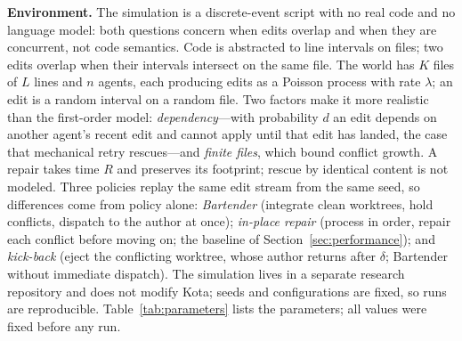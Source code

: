 \documentclass[pdflatex,sn-mathphys-ay]{sn-jnl}
\theoremstyle{thmstyleone}
\theoremstyle{thmstylethree}
\begin{document}
\textbf{Environment.} The simulation is a discrete-event script with no real code and no language model: both questions concern when edits overlap and when they are concurrent, not code semantics. Code is abstracted to line intervals on files; two edits overlap when their intervals intersect on the same file. The world has \(K\) files of \(L\) lines and \(n\) agents, each producing edits as a Poisson process with rate \(\lambda\); an edit is a random interval on a random file. Two factors make it more realistic than the first-order model: \emph{dependency}---with probability \(d\) an edit depends on another agent's recent edit and cannot apply until that edit has landed, the case that mechanical retry rescues---and \emph{finite files}, which bound conflict growth. A repair takes time \(R\) and preserves its footprint; rescue by identical content is not modeled. Three policies replay the same edit stream from the same seed, so differences come from policy alone: \emph{Bartender} (integrate clean worktrees, hold conflicts, dispatch to the author at once); \emph{in-place repair} (process in order, repair each conflict before moving on; the baseline of Section~\ref{sec:performance}); and \emph{kick-back} (eject the conflicting worktree, whose author returns after \(\delta\); Bartender without immediate dispatch). The simulation lives in a separate research repository and does not modify Kota; seeds and configurations are fixed, so runs are reproducible. Table~\ref{tab:parameters} lists the parameters; all values were fixed before any run.
\end{document}
